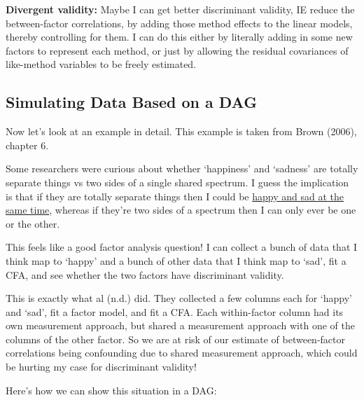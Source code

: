\documentclass[
  letterpaper,
  DIV=11,
  numbers=noendperiod]{scrreprt}
\begin{document}
\textbf{Divergent validity:} Maybe I can get better discriminant
validity, IE reduce the between-factor correlations, by adding those
method effects to the linear models, thereby controlling for them. I can
do this either by literally adding in some new factors to represent each
method, or just by allowing the residual covariances of like-method
variables to be freely estimated.

\hypertarget{simulating-data-based-on-a-dag}{%
\subsection*{Simulating Data Based on a
DAG}\label{simulating-data-based-on-a-dag}}

Now let's look at an example in detail. This example is taken from Brown
(2006), chapter 6.

Some researchers were curious about whether `happiness' and `sadness'
are totally separate things vs two sides of a single shared spectrum. I
guess the implication is that if they are totally separate things then I
could be \href{https://www.youtube.com/watch?v=U5oIvfraRrU}{happy and
sad at the same time}, whereas if they're two sides of a spectrum then I
can only ever be one or the other.

This feels like a good factor analysis question! I can collect a bunch
of data that I think map to `happy' and a bunch of other data that I
think map to `sad', fit a CFA, and see whether the two factors have
discriminant validity.

This is exactly what al (n.d.) did. They collected a few columns each
for `happy' and `sad', fit a factor model, and fit a CFA. Each
within-factor column had its own measurement approach, but shared a
measurement approach with one of the columns of the other factor. So we
are at risk of our estimate of between-factor correlations being
confounding due to shared measurement approach, which could be hurting
my case for discriminant validity!

Here's how we can show this situation in a DAG:
\end{document}

